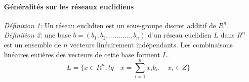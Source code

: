\documentclass[a4paper,12pt]{article}
\begin{document}
\paragraph{Généralités sur les réseaux euclidiens\cite{rapport_stage}}
\textit{ Définition 1:} Un réseau euclidien est un sous-groupe discret additif de $R^n$.\newline
\newline
\textit{ Définition 2:} une base $b= (b_1,b_2,...........,b_n)$  d’un réseau euclidien $L$ dans $R^n$ est un ensemble de $n$ vecteurs 
linéairement indépendants. Les combinaisons linéaires entières des vecteurs de cette base forment $L$.
$$L = \{x\in R^n, tq\quad x = \sum_{i=1}^{n} x_ib_i,\quad x_i\in Z\}$$
\newline
\newline    
\end{document}
